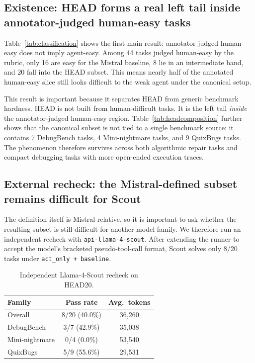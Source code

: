 \documentclass{article}
\begin{document}
\subsection{Existence: HEAD forms a real left tail inside annotator-judged human-easy tasks}

Table~\ref{tab:classification} shows the first main result: annotator-judged human-easy does not imply agent-easy. Among 44 tasks judged human-easy by the rubric, only 16 are easy for the Mistral baseline, 8 lie in an intermediate band, and 20 fall into the HEAD subset. This means nearly half of the annotated human-easy slice still looks difficult to the weak agent under the canonical setup.

This result is important because it separates HEAD from generic benchmark hardness. HEAD is not built from human-difficult tasks. It is the left tail \emph{inside} the annotator-judged human-easy region. Table~\ref{tab:headcomposition} further shows that the canonical subset is not tied to a single benchmark source: it contains 7 DebugBench tasks, 4 Mini-nightmare tasks, and 9 QuixBugs tasks. The phenomenon therefore survives across both algorithmic repair tasks and compact debugging tasks with more open-ended execution traces.

\subsection{External recheck: the Mistral-defined subset remains difficult for Scout}

The definition itself is Mistral-relative, so it is important to ask whether the resulting subset is still difficult for another model family. We therefore run an independent recheck with \texttt{api-llama-4-scout}. After extending the runner to accept the model's bracketed pseudo-tool-call format, Scout solves only 8/20 tasks under \texttt{act\_only + baseline}.

\begin{table}[t]
\centering
\caption{Independent Llama-4-Scout recheck on HEAD20.}
\label{tab:scout}
\begin{tabular}{lcc}
\toprule
Family & Pass rate & Avg.\ tokens \\
\midrule
Overall & 8/20 (40.0\%) & 36{,}260 \\
DebugBench & 3/7 (42.9\%) & 35{,}038 \\
Mini-nightmare & 0/4 (0.0\%) & 53{,}540 \\
QuixBugs & 5/9 (55.6\%) & 29{,}531 \\
\bottomrule
\end{tabular}
\end{table}
\end{document}
